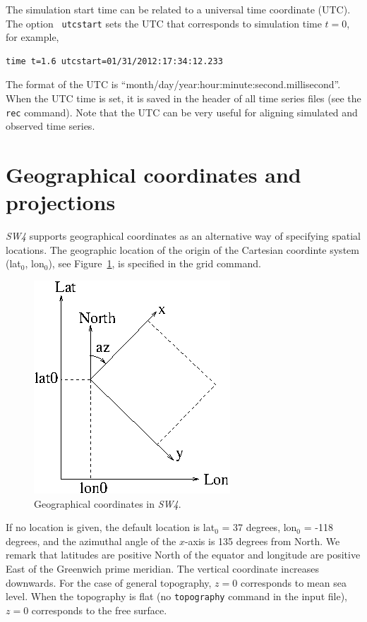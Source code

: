 \documentclass[11pt]{report}
\begin{document}
The simulation start time can be related to a universal time coordinate (UTC). The option {\tt
  utcstart} sets the UTC that corresponds to simulation time $t=0$, for example,
\begin{verbatim}
time t=1.6 utcstart=01/31/2012:17:34:12.233
\end{verbatim}
The format of the UTC is ``month/day/year:hour:minute:second.millisecond''. When the UTC time
is set, it is saved in the header of all time series files (see the {\tt rec} command). Note that
the UTC can be very useful for aligning simulated and observed time series.

\section{Geographical coordinates and projections}
\emph{SW4} supports geographical coordinates as an alternative way of specifying spatial
locations. The geographic location of the origin of the Cartesian coordinte system (lat$_0$,
lon$_0$), see Figure~\ref{fig:geocoord}, is specified in the grid command. 
\begin{figure}
\begin{centering}
  \includegraphics[width=0.5\linewidth]{figures/latlon.png}
  \caption{Geographical coordinates in \emph{SW4}.}
  \label{fig:geocoord}
\end{centering}
\end{figure}
If no location is given, the default location is lat$_0$ = 37 degrees, lon$_0$ = -118 degrees, and
the azimuthal angle of the $x$-axis is 135 degrees from North. We remark that latitudes are positive
North of the equator and longitude are positive East of the Greenwich prime meridian. The vertical
coordinate increases downwards. For the case of general topography, $z=0$ corresponds to mean sea
level. When the topography is flat (no {\tt topography} command in the input file), $z=0$
corresponds to the free surface.
\end{document}
